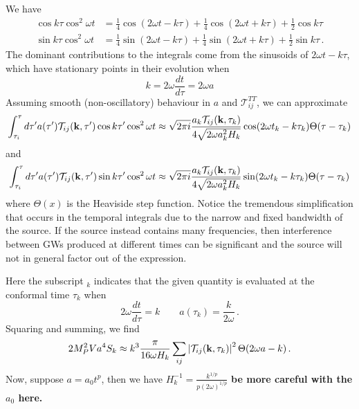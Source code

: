 \documentclass{revtex4}
\begin{document}
We have
\begin{subequations}
\begin{align}
  \cos k\tau\cos^2\omega t &= \frac{1}{4}\cos(2\omega t-k\tau) + \frac{1}{4}\cos(2\omega t+k\tau) + \frac{1}{2}\cos k\tau \\
  \sin k\tau\cos^2\omega t &= \frac{1}{4}\sin(2\omega t-k\tau) + \frac{1}{4}\sin(2\omega t+k\tau) + \frac{1}{2}\sin k\tau \, .
\end{align}
\end{subequations}
The dominant contributions to the integrals come from the sinusoids of $2\omega t - k\tau$, which have stationary points in their evolution when
\begin{equation}
  k = 2\omega\frac{dt}{d\tau} = 2\omega a
\end{equation}
Assuming smooth (non-oscillatory) behaviour in $a$ and $\mathcal{T}_{ij}^{TT}$, we can approximate
\begin{equation}
  \int_{\tau_i}^\tau d\tau' a(\tau')\mathcal{T}_{ij}({\bf k},\tau')\cos k\tau'\cos^2\omega t \approx \sqrt{2\pi i}\frac{a_k\mathcal{T}_{ij}({\bf k},\tau_k)}{4\sqrt{2\omega a^2_kH_k}}\cos(2\omega t_k -k\tau_k)\Theta(\tau - \tau_k)
\end{equation}
and
\begin{equation}
  \int_{\tau_i}^\tau d\tau' a(\tau')\mathcal{T}_{ij}({\bf k},\tau')\sin k\tau'\cos^2\omega t \approx \sqrt{2\pi i}\frac{a_k\mathcal{T}_{ij}({\bf k},\tau_k)}{4\sqrt{2\omega a^2_kH_k}}\sin(2\omega t_k -k\tau_k)\Theta(\tau - \tau_k)
\end{equation}
where $\Theta(x)$ is the Heaviside step function.
Notice the tremendous simplification that occurs in the temporal integrals due to the narrow and fixed bandwidth of the source.
If the source instead contains many frequencies, then interference between GWs produced at different times can be significant and the source will not in general factor out of the expression.

Here the subscript ${}_k$ indicates that the given quantity is evaluated at the conformal time $\tau_k$ when
\begin{equation}
  2\omega\frac{dt}{d\tau} = k \qquad a(\tau_k) = \frac{k}{2\omega} \, .
\end{equation}
Squaring and summing, we find
\begin{equation}
  2M_P^2Va^4S_k \approx k^3\frac{\pi}{16 \omega H_k}\sum_{ij}\left|\mathcal{T}_{ij}({\bf k},\tau_k)\right|^2\Theta(2\omega a - k) \, .
\end{equation}
Now, suppose $a = a_0 t^p$, then we have $H_k^{-1} = \frac{k^{1/p}}{p(2\omega)^{1/p}}$
{\bf be more careful with the $a_0$ here.}
\end{document}
